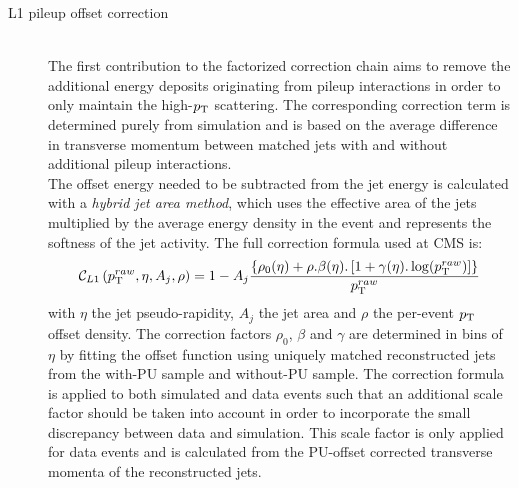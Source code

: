 \begin{myindentpar}
  \begin{description}
    \item[L1 pileup offset correction] \hfill \\
    The first contribution to the factorized correction chain aims to remove the additional energy deposits originating from pileup interactions in order to only maintain the high-$p_{\rm T}$ scattering. The corresponding correction term is determined purely from simulation and is based on the average difference in transverse momentum between matched jets with and without additional pileup interactions.
    \\
    
    \indPar The offset energy needed to be subtracted from the jet energy is calculated with a \textit{hybrid jet area method}, which uses the effective area of the jets multiplied by the average energy density in the event and represents the softness of the jet activity. The full correction formula used at CMS is:    
    \begin{equation}
     \mathcal{C}_{L1}\left(p_{\rm T}^{raw}, \eta, A_{j}, \rho \right) = 1 - A_{j} \dfrac{\left\lbrace \rho_{0}(\eta) + \rho . \beta(\eta) . \left[ 1 + \gamma(\eta).\log(p_{\rm T}^{raw}) \right] \right\rbrace}{p_{\rm T}^{raw}}
    \end{equation}
    with $\eta$ the jet pseudo-rapidity, $A_{j}$ the jet area and $\rho$ the per-event $p_{\rm T}$ offset density. 
    The correction factors $\rho_{0}$, $\beta$ and $\gamma$ are determined in bins of $\eta$ by fitting the offset function using uniquely matched reconstructed jets from the with-PU sample and without-PU sample. 
    The correction formula is applied to both simulated and data events such that an additional scale factor should be taken into account in order to incorporate the small discrepancy between data and simulation.
    This scale factor is only applied for data events and is calculated from the PU-offset corrected transverse momenta of the reconstructed jets.
    

\end{description}
\end{myindentpar}
